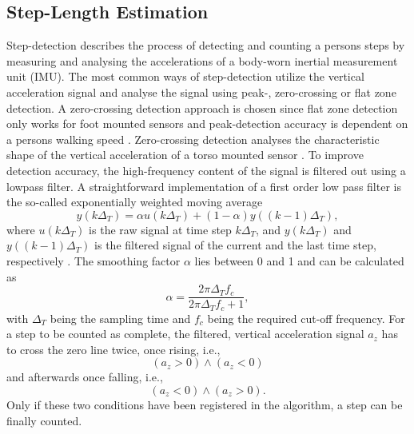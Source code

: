 \documentclass[engproc,conferenceproceedings,submit,pdftex,moreauthors]{Definitions/mdpi}
\begin{document}
\subsection{Step-Length Estimation}\label{sub:stepD}
Step-detection describes the process of detecting and counting a persons steps by measuring and analysing the accelerations of a body-worn inertial measurement unit (IMU). The most common ways of step-detection utilize  the vertical acceleration signal and analyse the signal using peak-, zero-crossing or flat zone detection. A zero-crossing detection approach is chosen since flat zone detection only works for foot mounted sensors and peak-detection accuracy is dependent on a persons walking speed \cite{shin2007}. Zero-crossing detection analyses the characteristic shape of the vertical acceleration of a torso mounted sensor \cite{zhao2022}. To improve detection accuracy, the high-frequency content of the signal is filtered out using a lowpass filter. A straightforward implementation of a first order low pass filter is the so-called exponentially weighted moving average 
\begin{equation}
	y(k\Delta_T) = \alpha u(k\Delta_T) + (1-\alpha) y((k-1)\Delta_T), 
\end{equation} where $u(k\Delta_T)$ is the raw signal at time step $k\Delta_T$, and $y(k\Delta_T)$ and $y((k-1)\Delta_T)$ is the filtered signal of the current and the last time step, respectively  \cite{nistsematech2012}. The smoothing factor $\alpha$ lies between 0 and 1 and can be calculated as 
\begin{equation}
	\alpha = \frac{2\pi \Delta_T f_c}{2\pi \Delta_T f_c +1},
\end{equation} with $\Delta_T$ being the sampling time and $f_c$ being the required cut-off frequency.  For a step to be counted as complete, the filtered, vertical acceleration signal $a_z$ has to cross the zero line twice, once rising, i.e.,
\begin{equation}
	(a_{z} > 0) \wedge (a_{z} < 0)  %
\end{equation} 
and afterwards once falling, i.e.,
\begin{equation}
	(a_{z} < 0) \wedge (a_{z} > 0).  %
\end{equation} 
Only if these two conditions have been registered in the algorithm, a step can be finally counted.
\end{document}

